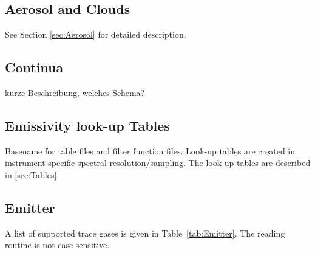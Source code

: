 
\subsection{Aerosol and Clouds}
See Section \ref{sec:Aerosol} for detailed description.

\subsection{Continua}
\todo kurze Beschreibung, welches Schema?

\subsection{Emissivity look-up Tables}
Basename for table files and filter function files. Look-up tables are created in instrument specific spectral resolution/sampling. The look-up tables are described in \ref{sec:Tables}.

\subsection{Emitter}
\label{sec:Emitter}
A list of supported trace gases is given in Table~\ref{tab:Emitter}. The reading routine is not case sensitive.

